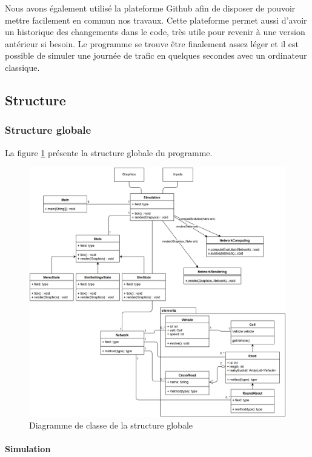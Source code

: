 \documentclass[a4paper,11pt, titlepage]{extarticle}
\begin{document}
Nous avons également utilisé la plateforme Github afin de disposer de pouvoir mettre facilement en commun nos travaux. Cette plateforme permet aussi d'avoir un historique des changements dans le code, très utile pour revenir à une version antérieur si besoin. Le programme se trouve être finalement assez léger et il est possible de simuler une journée de trafic en quelques secondes avec un ordinateur classique.

\subsection{Structure}

\subsubsection{Structure globale}

La figure \ref{imgGlobal} présente la structure globale du programme.

\begin{figure}[!h]
\begin{center}
\includegraphics[width=15cm]{structure_diagram.png}
\caption{Diagramme de classe de la structure globale}
\label{imgGlobal}
\end{center}
\end{figure}

\paragraph{Simulation}
\end{document}
